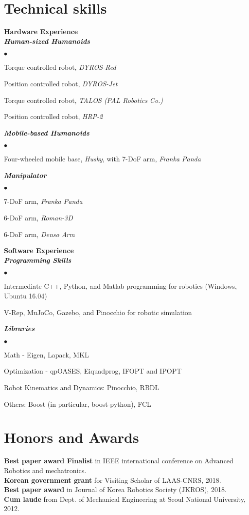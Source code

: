 \documentclass[margin,line]{res}
\newenvironment{list2}{
  \begin{list}{$\bullet$}{%
      \setlength{\itemsep}{0in}
      \setlength{\parsep}{0in} \setlength{\parskip}{0in}
      \setlength{\topsep}{0in} \setlength{\partopsep}{0in} 
      \setlength{\leftmargin}{0.2in}}}{\end{list}}
\begin{document}
\begin{resume}
\section{\sc Technical skills}
{\bf Hardware  Experience} \\
\textbf{\emph { Human-sized Humanoids}}
\begin{list2}
\item Torque controlled robot, \textit{DYROS-Red}
\item Position controlled robot, \textit{DYROS-Jet}
\item Torque controlled robot, \textit{TALOS (PAL Robotics Co.)}
\item Position controlled robot, \textit{HRP-2}
\end{list2}
\vspace{-0.3cm}
\textbf{\emph { Mobile-based Humanoids}}
\begin{list2}
\item Four-wheeled mobile base, \textit{Husky}, with 7-DoF arm, \textit{Franka Panda}
\end{list2}
\vspace{-0.3cm}
\textbf{\emph { Manipulator}}
\begin{list2}
\item 7-DoF arm, \textit{Franka Panda}
\item 6-DoF arm, \textit{Roman-3D}
\item 6-DoF arm, \textit{Denso Arm}
\end{list2}
{\bf Software Experience} \\
\textbf{\emph { Programming Skills}}
\begin{list2}
\item Intermediate C++, Python, and Matlab programming for robotics (Windows, Ubuntu 16.04)
\item V-Rep, MuJoCo, Gazebo, and Pinocchio for robotic simulation
\end{list2}
\vspace{-0.3cm}
\textbf{\emph { Libraries}}
\begin{list2}
\item Math - Eigen, Lapack, MKL
\item Optimization - qpOASES, Eiquadprog, IFOPT and IPOPT
\item Robot Kinematics and Dynamics: Pinocchio, RBDL
\item Others: Boost (in particular, boost-python), FCL
\end{list2}

\section{\sc Honors and Awards} 
\textbf{Best paper award Finalist} in IEEE international conference on Advanced Robotics and mechatronics. \\
\textbf{Korean government grant} for Visiting Scholar of LAAS-CNRS, 2018. \\
\textbf{Best paper award} in Journal of Korea Robotics Society (JKROS), 2018.\\
\textbf{Cum laude} from Dept. of Mechanical Engineering at Seoul National University, 2012. 



\end{resume}
\end{document}
